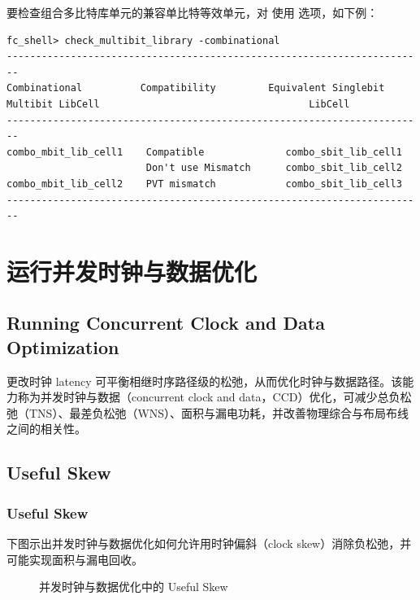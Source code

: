 要检查组合多比特库单元的兼容单比特等效单元，对  使用  选项，如下例：
\begin{lstlisting}
fc_shell> check_multibit_library -combinational
------------------------------------------------------------------------
Combinational          Compatibility         Equivalent Singlebit
Multibit LibCell                                    LibCell
------------------------------------------------------------------------
combo_mbit_lib_cell1    Compatible              combo_sbit_lib_cell1
                        Don't use Mismatch      combo_sbit_lib_cell2
combo_mbit_lib_cell2    PVT mismatch            combo_sbit_lib_cell3
------------------------------------------------------------------------
\end{lstlisting}

\section{运行并发时钟与数据优化}
\subsection*{Running Concurrent Clock and Data Optimization}

更改时钟 latency 可平衡相继时序路径级的松弛，从而优化时钟与数据路径。该能力称为并发时钟与数据（concurrent clock and data，CCD）优化，可减少总负松弛（TNS）、最差负松弛（WNS）、面积与漏电功耗，并改善物理综合与布局布线之间的相关性。

\subsection{Useful Skew}
\subsubsection*{Useful Skew}

下图示出并发时钟与数据优化如何允许用时钟偏斜（clock skew）消除负松弛，并可能实现面积与漏电回收。

\begin{figure}[htbp]
\centering
{}
\caption{并发时钟与数据优化中的 Useful Skew}
\label{fig:ccd-useful-skew}
\end{figure}

